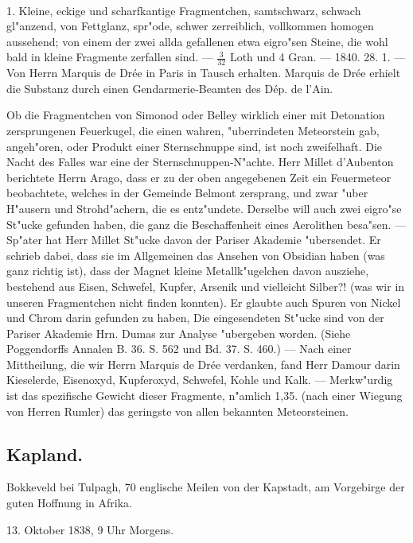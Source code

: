 \documentclass[a4paper, 11pt, oneside, polutonikogreek, german]{article}
\begin{document}
\paragraph{}
1. Kleine, eckige und scharfkantige Fragmentchen, samtschwarz, schwach gl"anzend, von Fettglanz, spr"ode, schwer zerreiblich, vollkommen homogen aussehend; von einem der zwei allda gefallenen etwa eigro"sen Steine, die wohl bald in kleine Fragmente zerfallen sind. --- $\frac{3}{32}$ Loth und 4 Gran. --- 1840. 28. 1. --- Von Herrn Marquis de Drée in Paris in Tausch erhalten. Marquis de Drée erhielt die Substanz durch einen Gendarmerie-Beamten des Dép. de l'Ain.

Ob die Fragmentchen von Simonod oder Belley wirklich einer mit Detonation zersprungenen Feuerkugel, die einen wahren, "uberrindeten Meteorstein gab, angeh"oren, oder Produkt einer Sternschnuppe sind, ist noch zweifelhaft. Die Nacht des Falles war eine der Sternschnuppen-N"achte. Herr Millet d’Aubenton berichtete Herrn Arago, dass er zu der oben angegebenen Zeit ein Feuermeteor beobachtete, welches in der Gemeinde Belmont zersprang, und zwar "uber H"ausern und Strohd"achern, die es entz"undete. Derselbe will auch zwei eigro"se St"ucke gefunden haben, die ganz die Beschaffenheit eines Aerolithen besa"sen. --- Sp"ater hat Herr Millet St"ucke davon der Pariser Akademie "ubersendet. Er schrieb dabei, dass sie im Allgemeinen das Ansehen von Obsidian haben (was ganz richtig ist), dass der Magnet kleine Metallk"ugelchen davon ausziehe, bestehend aus Eisen, Schwefel, Kupfer, Arsenik und vielleicht Silber?! (was wir in unseren Fragmentchen nicht finden konnten). Er glaubte auch Spuren von Nickel und Chrom darin gefunden zu haben, Die eingesendeten St"ucke sind von der Pariser Akademie Hrn. Dumas zur Analyse "ubergeben worden. (Siehe Poggendorffs Annalen B. 36. S. 562 und Bd. 37. S. 460.) --- Nach einer Mittheilung, die wir Herrn Marquis de Drée verdanken, fand Herr Damour darin Kieselerde, Eisenoxyd, Kupferoxyd, Schwefel, Kohle und Kalk. --- Merkw"urdig ist das spezifische Gewicht dieser Fragmente‚ n"amlich 1,35. (nach einer Wiegung von Herren Rumler) das geringste von allen bekannten Meteorsteinen.
\subsection{Kapland.}
\begin{center}
\small
Bokkeveld bei Tulpagh, 70 englische Meilen von der Kapstadt, am Vorgebirge der guten Hoffnung in Afrika.

13. Oktober 1838, 9 Uhr Morgens.
\end{center}
\end{document}
